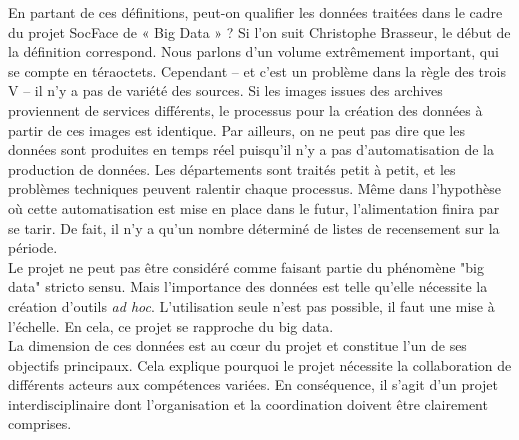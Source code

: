 En partant de ces définitions, peut-on qualifier les données traitées dans le cadre du projet SocFace de « Big Data » ? Si l’on suit Christophe Brasseur, le début de la définition correspond. Nous parlons d’un volume extrêmement important, qui se compte en téraoctets. Cependant – et c’est un problème dans la règle des trois V – il n’y a pas de variété des sources. Si les images issues des archives proviennent de services différents, le processus pour la création des données à partir de ces images est identique. Par ailleurs, on ne peut pas dire que les données sont produites en temps réel puisqu’il n'y a pas d’automatisation de la production de données. Les départements sont traités petit à petit, et les problèmes techniques peuvent ralentir chaque processus. Même dans l’hypothèse où cette automatisation est mise en place dans le futur, l’alimentation finira par se tarir. De fait, il n’y a qu’un nombre déterminé de listes de recensement sur la période. \\
 Le projet ne peut pas être considéré comme faisant partie du phénomène "big data" stricto sensu. Mais l'importance des données est telle qu'elle nécessite la création d'outils \textit{ad hoc}. L'utilisation seule n'est pas possible, il faut une mise à l'échelle. En cela, ce projet se rapproche du big data. \\
 
 La dimension de ces données est au cœur du projet et constitue l'un de ses objectifs principaux. Cela explique pourquoi le projet nécessite la collaboration de différents acteurs aux compétences variées. En conséquence, il s'agit d'un projet interdisciplinaire dont l'organisation et la coordination doivent être clairement comprises. 
